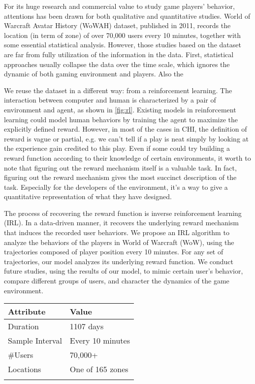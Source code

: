 \documentclass[a4paper]{article}
\begin{document}
For its huge research and commercial value to study game players' behavior, attentions has been drawn for both qualitative and quantitative studies. World of Warcraft Avatar History (WoWAH) dataset, published in 2011, records the location (in term of zone) of over 70,000 users every 10 minutes, together with some essential statistical analysis. However, those studies based on the dataset are far from fully utilization of the information in the data. First, statistical approaches usually collapse the data over the time scale, which ignores the dynamic of both gaming environment and players. Also the

We reuse the dataset in a different way: from a reinforcement learning. The interaction between computer and human is characterized by a pair of environment and agent, as shown in \ref{fig:rl}. Existing models in reinforcement learning could model human behaviors by training the agent to maximize the explicitly defined reward. However, in most of the cases in CHI, the definition of reward is vague or partial, e.g. we can't tell if a play is neat simply by looking at the experience gain credited to this play. Even if some could try building a reward function according to their knowledge of certain environments, it worth to note that figuring out the reward mechanism itself is a valuable task. In fact, figuring out the reward mechanism gives the most succinct description of the task. Especially for the developers of the environment, it's a way to give a quantitative representation of what they have designed.

The process of recovering the reward function is inverse reinforcement learning (IRL). In a data-driven manner, it recovers the underlying reward mechanism that induces the recorded user behaviors. We propose an IRL algorithm to analyze the behaviors of the players in World of Warcraft (WoW), using the trajectories composed of player position every 10 minutes. For any set of trajectories, our model analyzes its underlying reward function. We conduct future studies, using the results of our model, to mimic certain user's behavior, compare different groups of users, and character the dynamics of the game environment.

\begin{tabular}{ll}
    \toprule
    Attribute  &Value \\
    \midrule
    Duration & 1107 days \\
    Sample Interval & Every 10 minutes \\
    \#Users & 70,000+ \\
    Locations & One of 165 zones \\
    \bottomrule
    \label{tbl:wowah}
\end{tabular}
\end{document}
